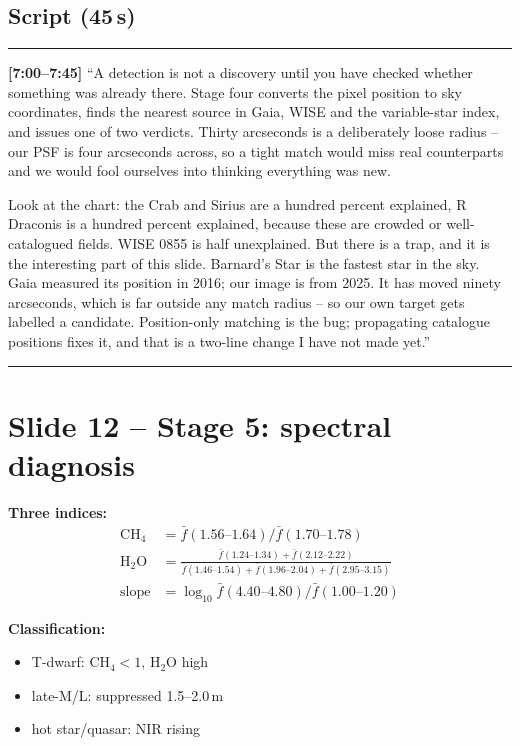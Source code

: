 \documentclass[11pt,a4paper]{article}
\begin{document}
\subsection*{Script (45\,s)}
\noindent\rule{\linewidth}{0.3pt}\par\smallskip\noindent
\textbf{[7:00--7:45]} ``A detection is not a discovery until you have checked whether something was
already there. Stage four converts the pixel position to sky coordinates, finds the nearest source in
Gaia, WISE and the variable-star index, and issues one of two verdicts. Thirty arcseconds is a
deliberately loose radius -- our PSF is four arcseconds across, so a tight match would miss real
counterparts and we would fool ourselves into thinking everything was new.

Look at the chart: the Crab and Sirius are a hundred percent explained, R Draconis is a hundred
percent explained, because these are crowded or well-catalogued fields. WISE 0855 is half unexplained.
But there is a trap, and it is the interesting part of this slide. Barnard's Star is the fastest star in
the sky. Gaia measured its position in 2016; our image is from 2025. It has moved ninety arcseconds,
which is far outside any match radius -- so our own target gets labelled a candidate. Position-only
matching is the bug; propagating catalogue positions fixes it, and that is a two-line change I have not
made yet.''
\par\smallskip\noindent\rule{\linewidth}{0.3pt}

\section{Slide 12 -- Stage 5: spectral diagnosis}

\textbf{Three indices:}
\begin{align*}
  \mathrm{CH_4} &= \bar f(1.56\text{--}1.64) / \bar f(1.70\text{--}1.78)\\[2pt]
  \mathrm{H_2O} &= \frac{\bar f(1.24\text{--}1.34)+\bar f(2.12\text{--}2.22)}
                          {\bar f(1.46\text{--}1.54)+\bar f(1.96\text{--}2.04)+\bar f(2.95\text{--}3.15)}\\[2pt]
  \mathrm{slope} &= \log_{10}\bar f(4.40\text{--}4.80) / \bar f(1.00\text{--}1.20)
\end{align*}

\textbf{Classification:}
\begin{itemize}[leftmargin=1em,itemsep=1pt]
\item T-dwarf: CH$_4 < 1$, H$_2$O high
\item late-M/L: suppressed 1.5--2.0\,\textmu m
\item hot star/quasar: NIR rising
\end{itemize}
\end{document}
